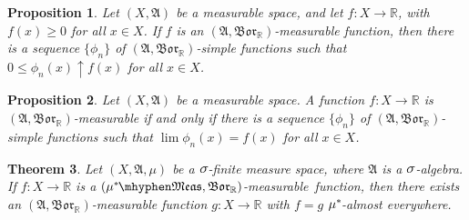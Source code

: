 \documentclass[
twoside=true,
paper=letter,
fontsize=9pt,
pagesize=auto,
leqno,
openany,
headsepline,
overfullrule,
]{scrbook}
\theoremstyle{plain}
\newtheorem{thm}{Theorem}[chapter]
\theoremstyle{plain}
\newtheorem{prop}[thm]{Proposition}
\theoremstyle{definition}
\theoremstyle{bfnoteitalic}
\theoremstyle{bfnoteroman}
\newcommand{\sigalg}[1]{\mathfrak{#1}}
\newcommand{\borel}{\mathfrak{Bor}}
\newcommand{\textsigma}{\hbox{\large{$\sigma$}}\kern-1pt}
\newcommand{\R}{\mathbb{R}}
\newcommand{\sigmaalgebra}{\sigalg{A}}
\newcommand{\measurable}[1]{{#1}\mhyphen\mathfrak{Meas}}
\newcommand{\kernast}{\ast\kern-1pt}
\newcommand{\mbmeasurable}{$(\measurable{\measure^\kernast},\borel_\R)$\hyp{}measurable}
\newcommand{\funcf}{f}
\newcommand{\measurespace}{X}
\newcommand{\measure}{\mu}
\begin{document}
\begin{prop}\label{measurable_implies_simple_function_limit}
Let $(\measurespace, \sigmaalgebra)$ be a measurable space, and let $f:\measurespace\to\R$, with $\funcf(x)\geq 0$ for all $x\in\measurespace$.
If $\funcf$ is an $(\sigmaalgebra, \borel_\R)$\hyp{}measurable function, then there is a sequence
$\{ \phi_n \}$ of $(\sigmaalgebra, \borel_\R)$\hyp{}simple functions such that
$0 \leq \phi_n(x) \uparrow \funcf(x)$ for all $x\in\measurespace$.
\end{prop}




\begin{prop}\label{measurable_equivalent_simple_function_limit}
Let $(\measurespace, \sigmaalgebra)$ be a measurable space.
A function $f:\measurespace\to\R$ is $(\sigmaalgebra,\borel_\R)$\hyp{}measurable if and only if there is a sequence $\{\phi_n\}$ of $(\sigmaalgebra, \borel_\R)$-simple functions such that $\lim \phi_n(x) = f(x)$ for all $x\in\measurespace$.
\end{prop}



\begin{thm}\label{mixing_measurable_functions}
Let $(\measurespace, \sigmaalgebra, \measure)$ be a $\textsigma$-finite measure space, where $\sigmaalgebra$ is a $\textsigma$-algebra.  If $f:\measurespace\to\R$ is a \mbmeasurable\ function, then there exists an $(\sigmaalgebra,\borel_\R)$\hyp{}measurable function $g:\measurespace\to\R$ with $f=g$ $\measure^\kernast$-almost everywhere.
\end{thm}
\end{document}
